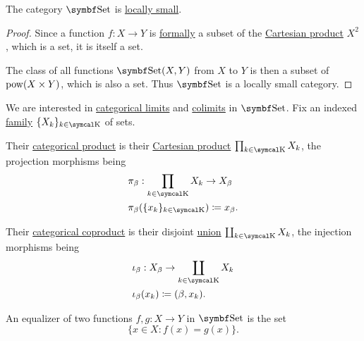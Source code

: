 \begin{Proposition}\label{thm:set_is_locally_small}
  The category \( \Cat{Set} \) is \hyperref[def:category_cardinality]{locally small}.
\end{Proposition}
\begin{proof}
  Since a function \( f: X \to Y \) is \hyperref[def:function]{formally} a subset of the \hyperref[def:cartesian_product]{Cartesian product} \( X^2 \), which is a set, it is itself a set.

  The class of all functions \( \Cat{Set}(X, Y) \) from \( X \) to \( Y \) is then a subset of \( \operatorname{pow}(X \times Y) \), which is also a set. Thus \( \Cat{Set} \) is a locally small category.
\end{proof}

\begin{Proposition}\label{thm:set_categorical_limits}
  We are interested in \hyperref[def:categorical_limit]{categorical limits} and \hyperref[def:categorical_colimit]{colimits} in \( \Cat{Set} \). Fix an indexed \hyperref[def:indexed_family]{family} \( \{ X_k \}_{k \in \CK} \) of sets.
  \begin{DefEnum}
     Their \hyperref[def:categorical_product]{categorical product} is their \hyperref[def:cartesian_product]{Cartesian product} \( \prod_{k \in \CK} X_k \), the projection morphisms being
    \begin{align*}
      &\pi_\beta: \prod_{k \in \CK} X_k \to X_\beta \\
      &\pi_\beta(\{ x_k \}_{k \in \CK}) \coloneqq x_\beta.
    \end{align*}

     Their \hyperref[def:categorical_coproduct]{categorical coproduct} is their disjoint \hyperref[def:disjoint_union]{union} \( \coprod_{k \in \CK} X_k \), the injection morphisms being
    \begin{align*}
      &\iota_\beta: X_\beta \to \coprod_{k \in \CK} X_k \\
      &\iota_\beta(x_k) \coloneqq (\beta, x_k).
    \end{align*}

     An equalizer of two functions \( f, g: X \to Y \) in \( \Cat{Set} \) is the set
    \begin{equation*}
      \{ x \in X \colon f(x) = g(x) \}.
    \end{equation*}


\end{DefEnum}
\end{Proposition}
